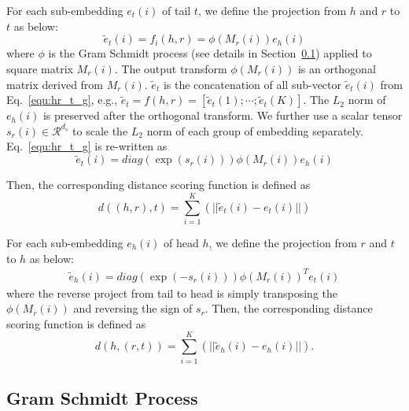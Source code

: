 \documentclass[11pt,a4paper]{article}
\begin{document}
For each sub-embedding $e_{t}(i)$ of tail $t$, we define the projection from $h$ and $r$ to $t$ as below:
\begin{equation}
    \tilde{e}_t(i) = f_{i}(h, r) = \phi(M_r(i)) e_h(i) \label{equ:hr_t_g}
\end{equation}
where $\phi$ is the Gram Schmidt process (see details in Section~\ref{sec:GS}) applied to square matrix $M_r(i)$. The output transform $\phi(M_r(i))$ is an orthogonal matrix derived from $M_r(i)$. 
$\tilde{e}_t$ is the concatenation of all sub-vector $\tilde{e}_t(i)$ from Eq.~\ref{equ:hr_t_g}, e.g., $\tilde{e}_t =f(h, r) = [\tilde{e}_t(1);\cdots;\tilde{e}_t(K)]$. 
The $L_2$ norm of $e_h(i)$ is preserved after the orthogonal transform.  We further use a scalar tensor $s_r(i) \in \mathcal{R}^{d_s}$ to scale the $L_2$ norm of each group of embedding separately. Eq.~\ref{equ:hr_t_g} is re-written as
\begin{equation}
    \tilde{e}_t(i) = diag(\exp(s_r(i))) \phi(M_r(i))  e_h(i) \label{equ:hr_t_g_s}
\end{equation}

Then, the corresponding distance scoring function is defined as
\begin{equation}
    d((h,r),t) = \sum_{i=1}^K ( ||\tilde{e}_t(i) - e_t(i)|| )  \label{equ:score_d_t}
\end{equation}







For each sub-embedding $e_{h}(i)$ of head $h$, we define the projection from $r$ and $t$ to $h$ as below:
\begin{eqnarray}
\tilde{e}_h(i)=diag(\exp(-s_r(i)))\phi(M_r(i))^T e_t(i) \label{equ:hr_t_g_r}
\end{eqnarray}
where the reverse project from tail to head is simply transposing the $\phi(M_r(i))$ and reversing the sign of $s_r$. Then, the corresponding distance scoring function is defined as
\begin{equation}
    d(h,(r, t)) = \sum_{i=1}^K ( ||\tilde{e}_h(i) - e_h(i)||).  \label{equ:score_d_h}
\end{equation}







\subsection{Gram Schmidt Process}
\label{sec:GS}
\end{document}
